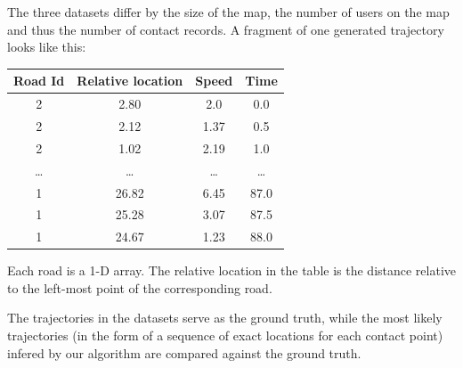 The three datasets differ by the size of the map, the number of
users on the map and thus the number of contact records. 
A fragment of one generated trajectory looks like this:
\begin{center}
\small
\begin{tabular}{ c | c | c | c  }

  Road Id & Relative location & Speed & Time \\ \hline
2	&2.80	& 2.0	& 0.0 \\
2	&2.12	&1.37	&0.5\\
2	&1.02	&2.19 	&1.0\\
\dots &\dots  & \dots  & \dots  \\
1	&26.82	&6.45 &	87.0\\
1	&25.28 	&3.07 	&87.5\\
1	&24.67	&1.23 	&88.0\\
\end{tabular}
\end{center}
Each road is a 1-D array. The relative location in the table is the distance relative to the left-most point of the corresponding road.

The trajectories in the datasets serve as the ground truth, while the
most likely trajectories (in the form of a sequence of exact locations 
for each contact point) infered by our algorithm are compared against the
ground truth.

